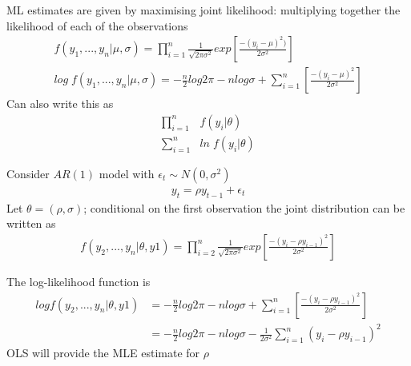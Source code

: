 \documentclass{beamer}
\begin{document}
\begin{frame}  
  ML estimates are given by maximising joint likelihood: multiplying together the likelihood of each of the observations
\begin{align}
  f(y_1,...,y_n| \mu, \sigma) = \prod^n_{i=1} \frac{1}{\sqrt{2\pi \sigma^2}} exp \left [ \frac{-(y_i-\mu)^2)}{2\sigma^2} \right ] \\
  log \;f(y_1,...,y_n| \mu, \sigma) = -\frac{n}{2} log 2\pi - n log \sigma + \sum^n_{i=1} \left [ \frac{-(y_i-\mu)^2}{2\sigma^2} \right ]
\end{align}
\medskip
 Can also write this as
 \begin{align}
   \prod^n_{i=1} & f(y_i| \theta)\\
   \sum^n_{i=1} & ln\; f(y_i| \theta)
 \end{align}
\end{frame}

\begin{frame}
  Consider $AR(1)$ model with $\epsilon_t \sim N(0, \sigma^2)$
\begin{align}
  y_t= \rho y_{t-1} + \epsilon_t
\end{align}
Let $\theta= (\rho, \sigma)$; conditional on the first observation the joint distribution can be written as
\begin{align}
  f(y_2,...,y_n| \theta, y1)= \prod^n_{i=2} \frac{1}{\sqrt{2 \pi \sigma^2}} exp \left [ \frac{-(y_i - \rho y_{i-1})^2}{2\sigma^2} \right ]
\end{align}
\end{frame}

\begin{frame}
  The log-likelihood function is
\begin{align}
  log f(y_2,...,y_n| \theta, y1) &= -\frac{n}{2} log 2\pi - n log \sigma + \sum^n_{i=1} 
  \left [ \frac{-(y_i-\rho y_{i-1})^2}{2\sigma^2} \right ]\\ \nonumber
  &=  -\frac{n}{2} log 2\pi - n log \sigma - \frac{1}{2\sigma^2} \sum^n_{i=1}(y_i-\rho y_{i-1})^2
\end{align}
OLS will provide the MLE estimate for $\rho$
\end{frame}
\end{document}
